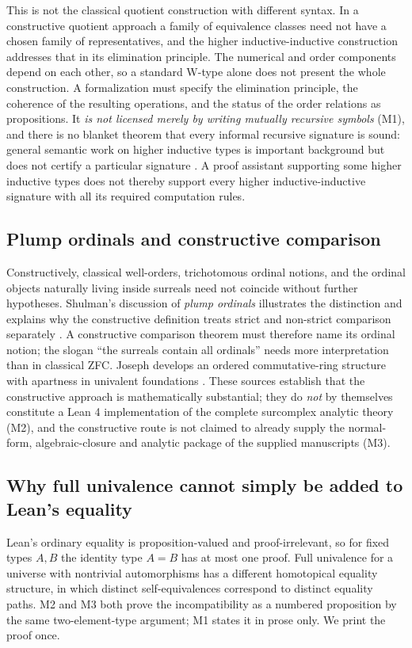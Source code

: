 \documentclass[11pt,letterpaper]{article}
\numberwithin{equation}{section}
\theoremstyle{definition}
\theoremstyle{remark}
\begin{document}
This is not the classical quotient construction with different syntax. In a
constructive quotient approach a family of equivalence classes need not have a
chosen family of representatives, and the higher inductive-inductive
construction addresses that in its elimination principle. The numerical and
order components depend on each other, so a standard W-type alone does not
present the whole construction. A formalization must specify the elimination
principle, the coherence of the resulting operations, and the status of the
order relations as propositions. It \emph{is not licensed merely by writing
mutually recursive symbols} (M1), and there is no blanket theorem that every
informal recursive signature is sound: general semantic work on higher inductive
types is important background but does not certify a particular signature
\cite{found:LumsdaineShulman,found:CubicalHIT}. A proof assistant supporting
some higher inductive types does not thereby support every higher
inductive-inductive signature with all its required computation rules.

\subsection{Plump ordinals and constructive comparison}
\label{found:sub:plump}
Constructively, classical well-orders, trichotomous ordinal notions, and the
ordinal objects naturally living inside surreals need not coincide without
further hypotheses. Shulman's discussion of \emph{plump ordinals} illustrates
the distinction and explains why the constructive definition treats strict and
non-strict comparison separately \cite{found:ShulmanPlump}. A constructive
comparison theorem must therefore name its ordinal notion; the slogan ``the
surreals contain all ordinals'' needs more interpretation than in classical ZFC.
Joseph develops an ordered commutative-ring structure with apartness in univalent
foundations \cite{found:Joseph}. These sources establish that the constructive
approach is mathematically substantial; they do \emph{not} by themselves
constitute a Lean 4 implementation of the complete surcomplex analytic theory
(M2), and the constructive route is not claimed to already supply the
normal-form, algebraic-closure and analytic package of the supplied manuscripts
(M3).

\subsection{Why full univalence cannot simply be added to Lean's equality}
\label{found:sub:univalence}
Lean's ordinary equality is proposition-valued and proof-irrelevant, so for
fixed types $A,B$ the identity type $A=B$ has at most one proof. Full univalence
for a universe with nontrivial automorphisms has a different homotopical
equality structure, in which distinct self-equivalences correspond to distinct
equality paths. M2 and M3 both prove the incompatibility as a numbered
proposition by the same two-element-type argument; M1 states it in prose only.
We print the proof once.
\end{document}
